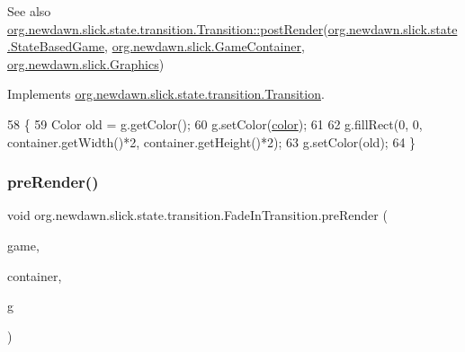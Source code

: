 \begin{DoxySeeAlso}{See also}
\mbox{\hyperlink{interfaceorg_1_1newdawn_1_1slick_1_1state_1_1transition_1_1_transition_ac113f4d5a19962a62a8adec7f9ab5d47}{org.\+newdawn.\+slick.\+state.\+transition.\+Transition\+::post\+Render}}(\mbox{\hyperlink{classorg_1_1newdawn_1_1slick_1_1state_1_1_state_based_game}{org.\+newdawn.\+slick.\+state.\+State\+Based\+Game}}, \mbox{\hyperlink{classorg_1_1newdawn_1_1slick_1_1_game_container}{org.\+newdawn.\+slick.\+Game\+Container}}, \mbox{\hyperlink{classorg_1_1newdawn_1_1slick_1_1_graphics}{org.\+newdawn.\+slick.\+Graphics}}) 
\end{DoxySeeAlso}


Implements \mbox{\hyperlink{interfaceorg_1_1newdawn_1_1slick_1_1state_1_1transition_1_1_transition_ac113f4d5a19962a62a8adec7f9ab5d47}{org.\+newdawn.\+slick.\+state.\+transition.\+Transition}}.


\begin{DoxyCode}
58                                                                                      \{
59         Color old = g.getColor();
60         g.setColor(\mbox{\hyperlink{classorg_1_1newdawn_1_1slick_1_1state_1_1transition_1_1_fade_in_transition_afaaf133a75453117cbd4250e93f375fc}{color}});
61         
62         g.fillRect(0, 0, container.getWidth()*2, container.getHeight()*2);
63         g.setColor(old);
64     \}
\end{DoxyCode}
\mbox{\label{classorg_1_1newdawn_1_1slick_1_1state_1_1transition_1_1_fade_in_transition_a393e56290e2fe2bb5d8c6fde7d11b3a2}} 
\subsubsection{\texorpdfstring{pre\+Render()}{preRender()}}
{\footnotesize\ttfamily void org.\+newdawn.\+slick.\+state.\+transition.\+Fade\+In\+Transition.\+pre\+Render (\begin{DoxyParamCaption}\item[{\mbox{\hyperlink{classorg_1_1newdawn_1_1slick_1_1state_1_1_state_based_game}{State\+Based\+Game}}}]{game,  }\item[{\mbox{\hyperlink{classorg_1_1newdawn_1_1slick_1_1_game_container}{Game\+Container}}}]{container,  }\item[{\mbox{\hyperlink{classorg_1_1newdawn_1_1slick_1_1_graphics}{Graphics}}}]{g }\end{DoxyParamCaption})\hspace{0.3cm}{\ttfamily [inline]}}

